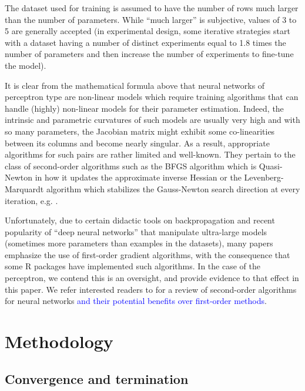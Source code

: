 The dataset used for training is assumed to have the number of rows much
larger than the number of parameters. While ``much larger'' is
subjective, values of 3 to 5 are generally accepted (in experimental
design, some iterative strategies start with a dataset having a number
of distinct experiments equal to 1.8 times the number of parameters and
then increase the number of experiments to fine-tune the model).

It is clear from the mathematical formula above that neural networks of
perceptron type are non-linear models which require training algorithms
that can handle (highly) non-linear models for their parameter
estimation. Indeed, the intrinsic and parametric curvatures of such
models are usually very high and with so many parameters, the Jacobian
matrix might exhibit some co-linearities between its columns and become
nearly singular. As a result, appropriate algorithms for such
 pairs are rather limited and well-known. They
pertain to the class of second-order algorithms such as the BFGS
algorithm which is Quasi-Newton in how it updates the approximate
inverse Hessian or the Levenberg-Marquardt algorithm which stabilizes
the Gauss-Newton search direction at every iteration, e.g.
\textcolor{cyan}{\citep{clemarechal,nocedal06}}.

Unfortunately, due to certain didactic tools on backpropagation and
recent popularity of ``deep neural networks'' that manipulate
ultra-large models (sometimes more parameters than examples in the
datasets), many papers emphasize the use of first-order gradient
algorithms, with the consequence that some \textsf{R} packages have
implemented such algorithms. In the case of the perceptron, we contend
this is an oversight, and provide evidence to that effect in this paper.
We refer interested readers to \citep{tan2019review} for a review of
second-order algorithms for neural networks
\textcolor{blue}{and their potential benefits over first-order methods}.

\hypertarget{methodology}{%
\section{Methodology}\label{methodology}}

\hypertarget{convergence-and-termination}{%
\subsection{Convergence and
termination}\label{convergence-and-termination}}

